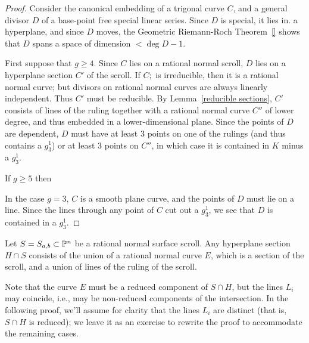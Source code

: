 \begin{proof}
Consider the canonical embedding of a trigonal curve $C$, and a general divisor $D$ of a base-point free special linear series. Since $D$ is special, it lies in. a hyperplane, and since $D$ moves, the Geometric Riemann-Roch Theorem~\ref{} shows that  $D$ spans a space of dimension $<\deg D-1$.  

First suppose that $g\geq 4$. Since $C$ lies on a rational normal scroll, $D$ lies on a hyperplane section $C'$ of the scroll. If $C;$  is irreducible, then it is a rational normal curve; but divisors on rational normal curves are always linearly independent. Thus $C'$ must be reducible. By Lemma~\ref{reducible sections}, $C'$ consists of lines of the ruling together with a rational normal curve $C''$ of lower degree, and thus embedded in a lower-dimensional plane. Since the points of $D$ are dependent, $D$ must have at least 3 points on one of the rulings (and thus contains a $g^1_3$) or at least 3 points on $C''$, in which case it is contained in $K$ minus a $g^1_3.$

If $g\geq 5$ then 

In the case $g =3$, $C$ is a smooth plane curve, and the points of $D$ must lie on a line. Since the lines through any point of $C$ cut out a $g^1_3$, we see that $D$ is contained in a $g^1_3$. 
\end{proof}

\begin{lemma}\label{reducible sections}
Let $S = S_{a,b} \subset \PP^n$ be a rational normal surface scroll. Any hyperplane section $H \cap S$ consists of the union of a rational normal curve $E$, which is a section of the scroll, and a union of lines of the ruling of the scroll.
\end{lemma}

Note that the curve $E$ must be a reduced component of $S \cap H$, but the lines $L_i$ may coincide, i.e., may be non-reduced components of the intersection. In the following proof, we'll assume for clarity that the lines $L_i$ are distinct (that is, $S \cap H$ is reduced); we leave it as an exercise to rewrite the proof to accommodate the remaining cases.

